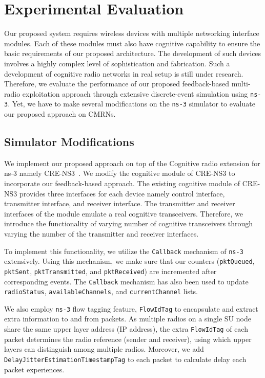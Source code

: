 \chapter{Experimental Evaluation}
\label{chap:results}

Our proposed system requires wireless devices with multiple networking interface modules. Each of these modules must also have cognitive capability to ensure the basic requirements of our proposed architecture. The development of such devices involves a highly complex level of sophistication and fabrication. Such a development of cognitive radio networks in real setup is still under research. Therefore, we evaluate the performance of our proposed feedback-based multi-radio exploitation approach through extensive discrete-event simulation using \texttt{ns-3}. Yet, we have to make several modifications on the \texttt{ns-3} simulator to evaluate our proposed approach on CMRNs.

\section{Simulator Modifications}

We implement our proposed approach on top of the Cognitive radio extension for ns-3 namely CRE-NS3~\cite{al2014simulating}. We modify the cognitive module of CRE-NS3 to incorporate our feedback-based approach. The existing cognitive module of CRE-NS3 provides three interfaces for each device namely control interface, transmitter interface, and receiver interface. The transmitter and receiver interfaces of the module emulate a real cognitive transceivers. Therefore, we introduce the functionality of varying number of cognitive transceivers through varying the number of the transmitter and receiver interfaces.

To implement this functionality, we utilize the \texttt{Callback} mechanism of \texttt{ns-3} extensively. Using this mechanism, we make sure that our counters (\texttt{pktQueued}, \texttt{pktSent}, \texttt{pktTransmitted}, and \texttt{pktReceived}) are incremented after corresponding events. The \texttt{Callback} mechanism has also been used to update \texttt{radioStatus}, \texttt{availableChannels}, and \texttt{currentChannel} lists.

 We also employ \texttt{ns-3} flow tagging feature, \texttt{FlowIdTag} to encapsulate and extract extra information to and from packets. As multiple radios on a single SU node share the same upper layer address (IP address), the extra \texttt{FlowIdTag} of each packet determines the radio reference (sender and receiver), using which upper layers can distinguish among multiple radios. Moreover, we add \texttt{DelayJitterEstimationTimestampTag} to each packet to calculate delay each packet experiences.

